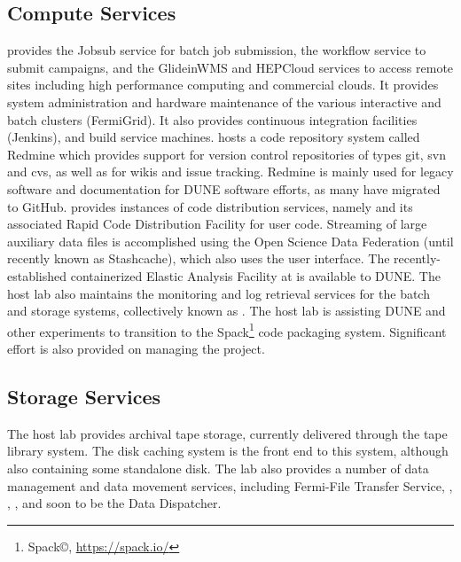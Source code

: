\documentclass[../main-v1.tex]{subfiles}
\begin{document}

\subsection{Compute Services}
 provides the Jobsub service for batch job submission, the  workflow service to submit campaigns, and the GlideinWMS
and HEPCloud services to access remote sites including high performance computing and commercial clouds. It provides system administration and hardware maintenance of the various interactive and batch clusters (FermiGrid).  It also provides
continuous integration facilities (Jenkins), and build service machines.    hosts a code repository system called Redmine which provides support for version control repositories of types git, svn and cvs, as well as for wikis and issue tracking.  Redmine is mainly used for legacy software and documentation for DUNE software efforts, as many have migrated to GitHub.    provides instances of code distribution services, namely  and its associated Rapid Code Distribution Facility for user code.  Streaming of large auxiliary data files is accomplished using the Open Science Data Federation (until recently known as 
Stashcache), which also uses the  user interface. 
The recently-established containerized Elastic Analysis Facility at   is available to DUNE.  The host lab also maintains
the monitoring and log retrieval services for the batch and storage systems, collectively known as . 
 The host lab is assisting DUNE and other experiments to transition to the Spack\footnote{Spack\copyright, \url{https://spack.io/}} code packaging system.  Significant effort is also provided on managing the  project.

\subsection{Storage Services}
The host lab provides archival tape storage, currently delivered through the  tape library system.  The  
disk caching system is the front end to this system, although also containing some standalone disk.  The lab also provides a number of data management and data movement services, including Fermi-File Transfer Service, , , , and soon to be the Data Dispatcher. 
\end{document}
